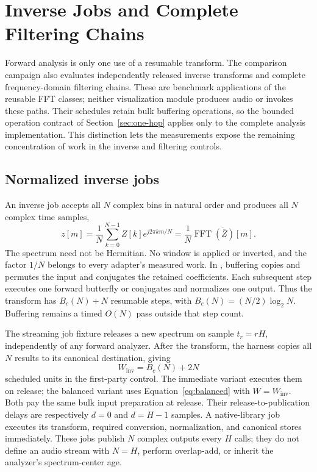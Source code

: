 \section{Inverse Jobs and Complete Filtering Chains}
\label{sec:inverse-chain}
Forward analysis is only one use of a resumable transform. The comparison
campaign also evaluates independently released inverse transforms and complete
frequency-domain filtering chains. These are benchmark applications of the
reusable FFT classes; neither visualization module produces audio or invokes
these paths. Their schedules retain bulk buffering operations, so the bounded
operation contract of Section~\ref{sec:one-hop} applies only to the complete
analysis implementation. This distinction lets the measurements expose the
remaining concentration of work in the inverse and filtering controls.

\subsection{Normalized inverse jobs}
An inverse job accepts all $N$ complex bins in natural order and produces all
$N$ complex time samples,
\begin{equation}
 z[m]=\frac{1}{N}\sum_{k=0}^{N-1}Z[k]e^{j2\pi km/N}
     =\frac{1}{N}\overline{\operatorname{FFT}(\overline Z)[m]}.
 \label{eq:inverse-contract}
\end{equation}
The spectrum need not be Hermitian. No window is applied or inverted, and the
factor $1/N$ belongs to every adapter's measured work. In
, buffering copies and permutes the input and conjugates
the retained coefficients. Each subsequent step executes one forward
butterfly or conjugates and normalizes one output. Thus the transform has
$B_c(N)+N$ resumable steps, with $B_c(N)=(N/2)\log_2N$.
Buffering remains a timed $O(N)$ pass outside that step count.

The streaming job fixture releases a new spectrum on sample $t_r=rH$,
independently of any forward analyzer. After the transform, the harness copies
all $N$ results to its canonical destination, giving
\begin{equation}
 W_{\mathrm{inv}}=B_c(N)+2N
 \label{eq:inverse-work}
\end{equation}
scheduled units in the first-party control. The immediate variant executes
them on release; the balanced variant uses Equation~\eqref{eq:balanced} with
$W=W_{\mathrm{inv}}$. Both pay the same bulk input preparation at release.
Their release-to-publication delays are respectively $d=0$ and $d=H-1$
samples. A native-library job executes its transform, required conversion,
normalization, and canonical stores immediately. These jobs publish $N$
complex outputs every $H$ calls; they do not define an audio stream with
$N=H$, perform overlap-add, or inherit the analyzer's spectrum-center age.

